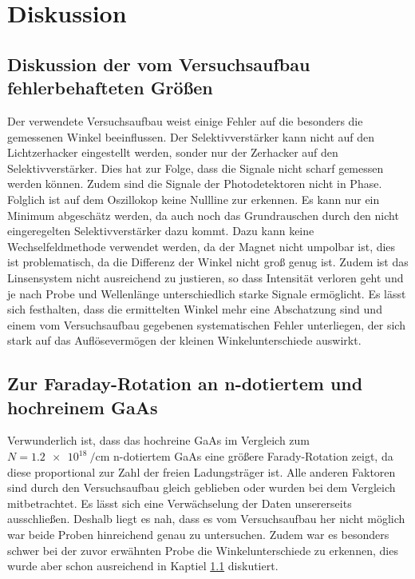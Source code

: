\section{Diskussion}
\label{sec:Diskussion}
\subsection{Diskussion der vom Versuchsaufbau fehlerbehafteten Größen}
\label{sec:Fehler}
Der verwendete Versuchsaufbau weist einige Fehler auf die besonders die gemessenen Winkel
beeinflussen. Der Selektivverstärker kann nicht auf den Lichtzerhacker eingestellt
werden, sonder nur der Zerhacker auf den Selektivverstärker. Dies hat zur Folge, dass die Signale
nicht scharf gemessen werden können. Zudem sind die Signale der
Photodetektoren nicht in Phase. Folglich ist auf dem Oszillokop keine Nullline zur erkennen. Es kann
nur ein Minimum abgeschätz werden, da auch noch das Grundrauschen durch den nicht
eingeregelten Selektivverstärker dazu kommt. Dazu kann keine Wechselfeldmethode verwendet werden, da
der Magnet nicht umpolbar ist, dies ist problematisch, da die Differenz der Winkel nicht groß genug ist.
Zudem ist das Linsensystem nicht ausreichend zu justieren, so dass Intensität verloren geht
und je nach Probe und Wellenlänge unterschiedlich starke Signale ermöglicht.
Es lässt sich festhalten, dass die ermittelten Winkel mehr eine Abschatzung sind und einem vom
Versuchsaufbau gegebenen systematischen Fehler unterliegen, der sich stark auf das Auflösevermögen
der kleinen Winkelunterschiede auswirkt.

\subsection{Zur Faraday-Rotation an n-dotiertem und hochreinem GaAs}
Verwunderlich ist, dass das hochreine GaAs im Vergleich zum $N= \SI{1.2e18}{\per\centi\meter}$
n-dotiertem GaAs eine größere Farady-Rotation zeigt, da diese
proportional zur Zahl der freien Ladungsträger ist. Alle anderen Faktoren sind durch den
Versuchsaufbau gleich geblieben oder wurden bei dem Vergleich mitbetrachtet. Es lässt sich eine
Verwächselung der Daten unsererseits ausschließen. Deshalb liegt es nah, dass es vom Versuchsaufbau
her nicht möglich war beide Proben hinreichend genau zu untersuchen. Zudem war es besonders schwer
bei der zuvor erwähnten Probe die Winkelunterschiede zu erkennen, dies wurde aber schon ausreichend in Kaptiel \ref{sec:Fehler} diskutiert.

